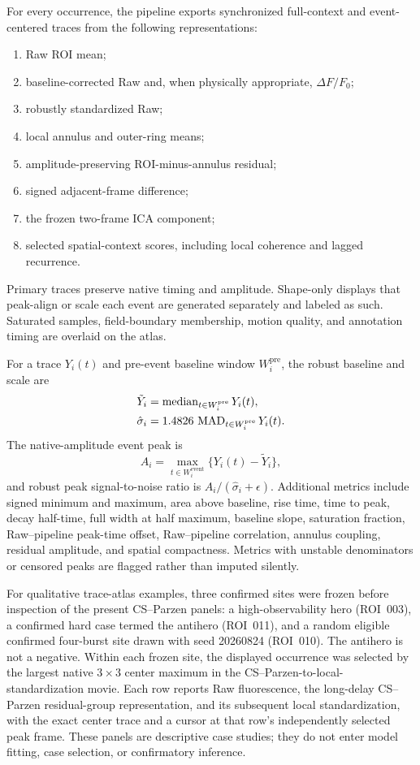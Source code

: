 For every occurrence, the pipeline exports synchronized full-context and event-centered traces from the following representations:
\begin{enumerate}[label=(\alph*)]
  \item Raw ROI mean;
  \item baseline-corrected Raw and, when physically appropriate, $\Delta F/F_0$;
  \item robustly standardized Raw;
  \item local annulus and outer-ring means;
  \item amplitude-preserving ROI-minus-annulus residual;
  \item signed adjacent-frame difference;
  \item the frozen two-frame ICA component;
  \item selected spatial-context scores, including local coherence and lagged recurrence.
\end{enumerate}

Primary traces preserve native timing and amplitude. Shape-only displays that peak-align or scale each event are generated separately and labeled as such. Saturated samples, field-boundary membership, motion quality, and annotation timing are overlaid on the atlas.

For a trace $Y_i(t)$ and pre-event baseline window $W_i^{\mathrm{pre}}$, the robust baseline and scale are
\begin{align}
  \tilde Y_i &= \operatorname{median}_{t\in W_i^{\mathrm{pre}}} Y_i(t),\\
  \hat\sigma_i &= 1.4826\,\operatorname{MAD}_{t\in W_i^{\mathrm{pre}}}Y_i(t).
\end{align}
The native-amplitude event peak is
\begin{equation}
  A_i = \max_{t\in W_i^{\mathrm{event}}}\{Y_i(t)-\tilde Y_i\},
\end{equation}
and robust peak signal-to-noise ratio is $A_i/(\hat\sigma_i+\epsilon)$. Additional metrics include signed minimum and maximum, area above baseline, rise time, time to peak, decay half-time, full width at half maximum, baseline slope, saturation fraction, Raw--pipeline peak-time offset, Raw--pipeline correlation, annulus coupling, residual amplitude, and spatial compactness. Metrics with unstable denominators or censored peaks are flagged rather than imputed silently.

For qualitative trace-atlas examples, three confirmed sites were frozen before
inspection of the present CS--Parzen panels: a high-observability hero
(ROI~003), a confirmed hard case termed the antihero (ROI~011), and a random
eligible confirmed four-burst site drawn with seed 20260824 (ROI~010). The
antihero is not a negative. Within each frozen site, the displayed occurrence
was selected by the largest native $3\times3$ center maximum in the
CS--Parzen-to-local-standardization movie. Each row reports Raw fluorescence,
the long-delay CS--Parzen residual-group representation, and its subsequent
local standardization, with the exact center trace and a cursor at that row's
independently selected peak frame. These panels are descriptive case studies;
they do not enter model fitting, case selection, or confirmatory inference.

